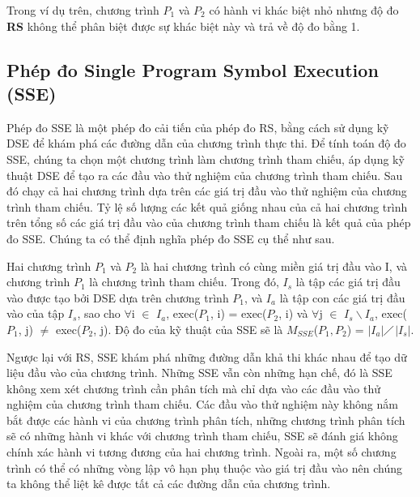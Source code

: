Trong ví dụ trên, chương trình $P_{1}$ và $P_{2}$ có hành vi khác biệt
nhỏ nhưng độ đo \textbf{RS} không thể phân biệt được sự khác biệt này
và trả về độ đo bằng 1.
	
\subsection{Phép đo Single Program Symbol Execution (SSE)}
Phép đo SSE là một phép đo cải tiến của phép đo RS, bằng cách sử dụng kỹ DSE để khám phá các đường dẫn của chương trình thực thi. Để tính toán độ đo SSE, chúng ta chọn một chương trình làm chương trình tham chiếu, áp dụng kỹ thuật DSE để tạo ra các đầu vào thử nghiệm của chương trình tham chiếu. Sau đó chạy cả hai chương trình dựa trên các giá trị đầu vào thử nghiệm của chương trình tham chiếu. Tỷ lệ số lượng các kết quả giống nhau của cả hai chương trình trên tổng số các giá trị đầu vào của chương trình tham chiếu là kết quả của phép đo SSE. Chúng ta có thể định nghĩa phép đo SSE cụ thể như sau.

\begin{definition}
  Hai chương trình $P_{1}$ và $P_{2}$ là hai chương trình có cùng miền
  giá trị đầu vào I, và chương trình $P_{1}$ là chương trình tham chiếu. Trong đó,
  $I_{s}$ là tập các giá trị đầu vào được tạo bởi DSE dựa trên chương trình $P_{1}$, và
  $I_{a}$ là tập con các giá trị đầu vào của tập $I_{s}$, sao cho
  $\forall$i $\in$ $I_{a}$, exec($P_{1}$, i) = exec($P_{2}$, i) và
  $\forall$j $\in$ $I_{s} \backslash I_{a}$, exec($P_{1}$, j) $\neq$
  exec($P_{2}$, j). Độ đo của kỹ thuật của SSE sẽ là
  $M_{SSE}$($P_{1},P_{2}$) =
  $\left|I_{a}\right|$$\diagup$$\left|I_{s}\right|$.
\end{definition}

Ngược lại với RS, SSE khám phá những đường dẫn khả thi khác nhau để tạo dữ liệu đầu vào của chương trình. Những SSE vẫn còn những hạn chế, đó là SSE không xem xét chương trình cần phân tích mà chỉ dựa vào các đầu vào thử nghiệm của chương trình tham chiếu. Các đầu vào thử nghiệm này không nắm bắt được các hành vi của chương trình phân tích, những chương trình phân tích sẽ có những hành vi khác với chương trình tham chiếu, SSE sẽ đánh giá không chính xác hành vi tương đương của hai chương trình. Ngoài ra, một số chương trình có thể có những vòng lập vô hạn phụ thuộc vào giá trị đầu vào nên chúng ta không thể liệt kê được tất cả các đường dẫn của chương trình.

